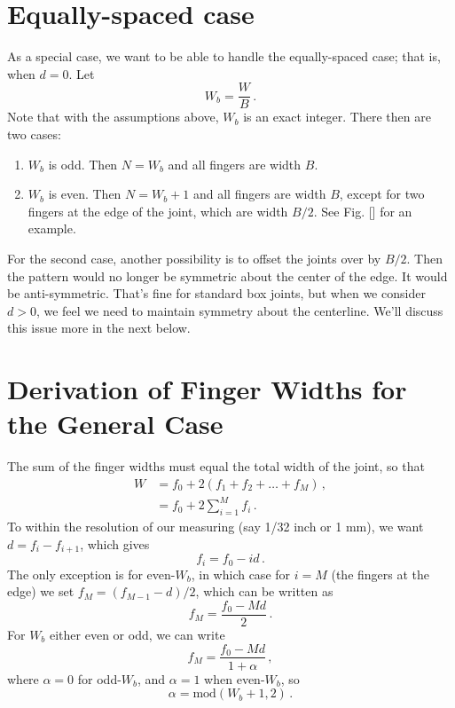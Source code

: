 \documentclass[12pt,final]{article}
\begin{document}
\section{Equally-spaced case}

As a special case, we want to be able to handle the equally-spaced case; that
is, when $d = 0$.  Let
\begin{equation}
  W_b = \frac{W}{B}\,.
\end{equation}
Note that with the assumptions above, $W_b$ is an exact integer.  There then are
two cases:
\begin{enumerate}
\item $W_b$ is odd.  Then $N = W_b$ and all fingers are width $B$.
\item $W_b$ is even.  Then $N = W_b+1$ and all fingers are width $B$, except for
  two fingers at the edge of the joint, which are width $B / 2$.  See Fig. []
  for an example.
\end{enumerate}
For the second case, another possibility is to offset the joints over by $B/2$.
Then the pattern would no longer be symmetric about the center of the edge.
It would be anti-symmetric.  That's fine for standard box joints, 
but when we consider $d > 0$, we feel we need to maintain symmetry about the
centerline. We'll discuss this issue more in the next below.

\section{Derivation of Finger Widths for the General Case}

The sum of the finger widths must equal the total width of the joint, so that
\begin{align}
  W &= f_0 + 2 (f_1 + f_2 + \ldots + f_M)\,,\\
    &= f_0 + 2 \sum_{i = 1}^{M} f_i\,.
\end{align}
To within the resolution of our measuring (say 1/32 inch or 1 mm), we want $d =
f_i - f_{i+1}$, which gives
\begin{equation}
  \label{eq:fi}
  f_i = f_0 - i d\,.
\end{equation}
The only exception is for even-$W_b$, in which case for $i = M$ (the fingers at
the edge) we set $f_{M} = (f_{M-1} - d)/ 2$, which can be written as
\begin{equation}
  f_M = \frac{f_0 - M d}{2}\,.
\end{equation}
For $W_b$ either even or odd, we can write
\begin{equation}
  \label{eq:fm}
  f_M = \frac{f_0 - M d}{1 + \alpha}\,,
\end{equation}
where $\alpha = 0$ for odd-$W_b$, and $\alpha = 1$ when even-$W_b$, so
\begin{equation}
     \alpha = \text{mod}(W_b+ 1, 2)\,.
\end{equation}
\end{document}
